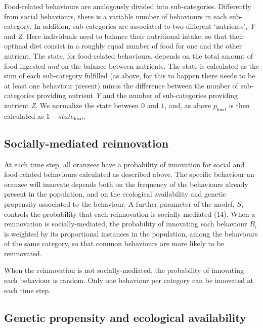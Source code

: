 \documentclass[9pt,twocolumn,twoside,]{pnas-new}
\begin{document}
Food-related behaviours are analogously divided into sub-categories.
Differently from social behaviours, there is a variable number of
behaviours in each sub-category. In addition, sub-categories are
associated to two different `nutrients', \emph{Y} and \emph{Z}. Here
individuals need to balance their nutritional intake, so that their
optimal diet consist in a roughly equal number of food for one and the
other nutrient. The state, for food-related behaviours, depends on the
total amount of food ingested \emph{and} on the balance between
nutrients. The state is calculated as the sum of each sub-category
fulfilled (as above, for this to happen there needs to be at least one
behaviour present) minus the difference between the number of
sub-categories providing nutrient \emph{Y} and the number of
sub-categories providing nutrient \emph{Z}. We normalize the state
between \(0\) and \(1\), and, as above \(p_\text{food}\) is then
calculated as \(1-state_\text{food}\).

\subsection*{Socially-mediated reinnovation}\label{format}

At each time step, all oranzees have a probability of innovation for
social and food-related behaviours calculated as described above. The
specific behaviour an oranzee will innovate depends both on the
frequency of the behaviours already present in the population, and on
the ecological availability and genetic propensity associated to the
behaviour. A further parameter of the model, \(S\), controls the
probability that each reinnovation is socially-mediated (14). When a
reinnovation is socially-mediated, the probability of innovating each
behaviour \(B_i\) is weighted by its proportional instances in the
population, among the behaviours of the same category, so that common
behaviours are more likely to be reinnovated.

When the reinnovation is not socially-mediated, the probability of
innovating each behaviour is random. Only one behaviour per category can
be innovated at each time step.

\subsection*{Genetic propensity and ecological
availability}\label{format}
\end{document}

